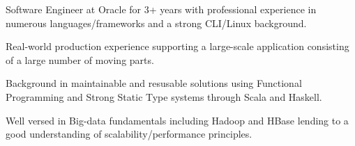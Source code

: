 

\begin{cvparagraph}


Software Engineer at Oracle for 3+ years with professional experience in numerous languages/frameworks and a strong CLI/Linux background.

Real-world production experience supporting a large-scale application consisting of a large number of moving parts.

Background in maintainable and resusable solutions using Functional Programming and Strong Static Type systems through Scala and Haskell.

Well versed in Big-data fundamentals including Hadoop and HBase lending to a good understanding of scalability/performance principles.



\end{cvparagraph}
